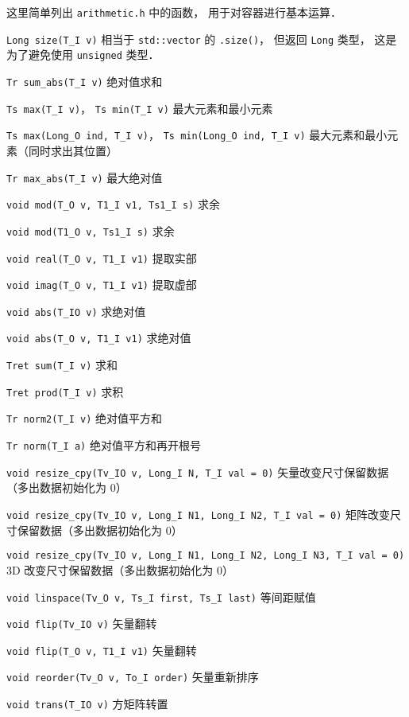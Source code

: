 
\begin{issues}
\issueDraft
\end{issues}


这里简单列出 \verb|arithmetic.h| 中的函数， 用于对容器进行基本运算．

\verb|Long size(T_I v)| 相当于 \verb|std::vector| 的 \verb|.size()|， 但返回 \verb|Long| 类型， 这是为了避免使用 \verb|unsigned| 类型．

\verb|Tr sum_abs(T_I v)| 绝对值求和

\verb|Ts max(T_I v)|， \verb|Ts min(T_I v)| 最大元素和最小元素

\verb|Ts max(Long_O ind, T_I v)|， \verb|Ts min(Long_O ind, T_I v)| 最大元素和最小元素（同时求出其位置）

\verb|Tr max_abs(T_I v)| 最大绝对值

\verb|void mod(T_O v, T1_I v1, Ts1_I s)| 求余

\verb|void mod(T1_O v, Ts1_I s)| 求余

\verb|void real(T_O v, T1_I v1)| 提取实部

\verb|void imag(T_O v, T1_I v1)| 提取虚部

\verb|void abs(T_IO v)| 求绝对值

\verb|void abs(T_O v, T1_I v1)| 求绝对值

\verb|Tret sum(T_I v)| 求和

\verb|Tret prod(T_I v)| 求积

\verb|Tr norm2(T_I v)| 绝对值平方和

\verb|Tr norm(T_I a)| 绝对值平方和再开根号

\verb|void resize_cpy(Tv_IO v, Long_I N, T_I val = 0)| 矢量改变尺寸保留数据（多出数据初始化为 0）

\verb|void resize_cpy(Tv_IO v, Long_I N1, Long_I N2, T_I val = 0)| 矩阵改变尺寸保留数据（多出数据初始化为 0）

\verb|void resize_cpy(Tv_IO v, Long_I N1, Long_I N2, Long_I N3, T_I val = 0)| 3D 改变尺寸保留数据（多出数据初始化为 0）

\verb|void linspace(Tv_O v, Ts_I first, Ts_I last)| 等间距赋值

\verb|void flip(Tv_IO v)| 矢量翻转

\verb|void flip(T_O v, T1_I v1)| 矢量翻转

\verb|void reorder(Tv_O v, To_I order)| 矢量重新排序

\verb|void trans(T_IO v)| 方矩阵转置

